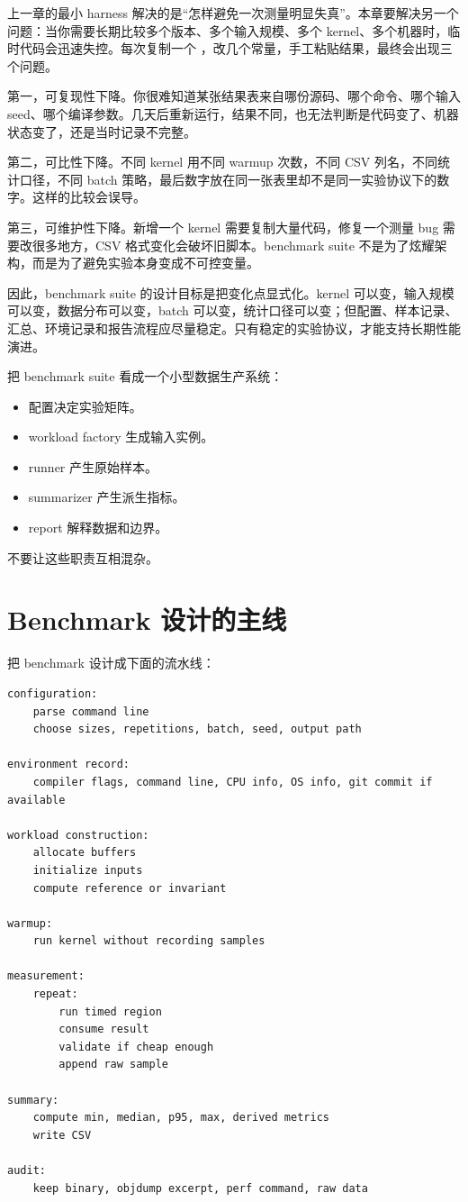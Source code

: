 上一章的最小 harness 解决的是“怎样避免一次测量明显失真”。本章要解决另一个问题：当你需要长期比较多个版本、多个输入规模、多个 kernel、多个机器时，临时代码会迅速失控。每次复制一个 ，改几个常量，手工粘贴结果，最终会出现三个问题。

第一，可复现性下降。你很难知道某张结果表来自哪份源码、哪个命令、哪个输入 seed、哪个编译参数。几天后重新运行，结果不同，也无法判断是代码变了、机器状态变了，还是当时记录不完整。

第二，可比性下降。不同 kernel 用不同 warmup 次数，不同 CSV 列名，不同统计口径，不同 batch 策略，最后数字放在同一张表里却不是同一实验协议下的数字。这样的比较会误导。

第三，可维护性下降。新增一个 kernel 需要复制大量代码，修复一个测量 bug 需要改很多地方，CSV 格式变化会破坏旧脚本。benchmark suite 不是为了炫耀架构，而是为了避免实验本身变成不可控变量。

因此，benchmark suite 的设计目标是把变化点显式化。kernel 可以变，输入规模可以变，数据分布可以变，batch 可以变，统计口径可以变；但配置、样本记录、汇总、环境记录和报告流程应尽量稳定。只有稳定的实验协议，才能支持长期性能演进。

\begin{mentalmodel}
把 benchmark suite 看成一个小型数据生产系统：

\begin{itemize}
  \item 配置决定实验矩阵。
  \item workload factory 生成输入实例。
  \item runner 产生原始样本。
  \item summarizer 产生派生指标。
  \item report 解释数据和边界。
\end{itemize}

不要让这些职责互相混杂。
\end{mentalmodel}

\section{Benchmark 设计的主线}

把 benchmark 设计成下面的流水线：

\begin{lstlisting}
configuration:
    parse command line
    choose sizes, repetitions, batch, seed, output path

environment record:
    compiler flags, command line, CPU info, OS info, git commit if available

workload construction:
    allocate buffers
    initialize inputs
    compute reference or invariant

warmup:
    run kernel without recording samples

measurement:
    repeat:
        run timed region
        consume result
        validate if cheap enough
        append raw sample

summary:
    compute min, median, p95, max, derived metrics
    write CSV

audit:
    keep binary, objdump excerpt, perf command, raw data
\end{lstlisting}

